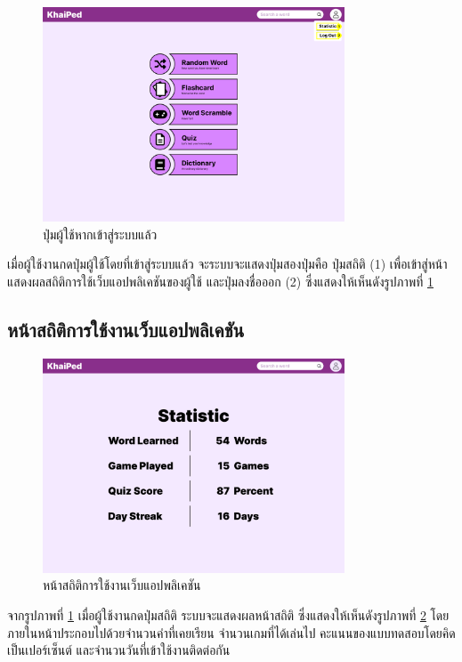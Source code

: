 \documentclass[12pt,oneside,openright,a4paper]{cpe-thai-project}
\begin{document}
\pagebreak
\begin{figure}[!h]\centering
	\includegraphics[width=0.8\textwidth, keepaspectratio=true]{image/chap3/ui/statistic/Home page - Logged In User Button.png}
	\caption{ปุ่มผู้ใช้หากเข้าสู่ระบบแล้ว}\label{fig:UI_UserButton}
\end{figure}
\hspace{1cm}
เมื่อผู้ใช้งานกดปุ่มผู้ใช้โดยที่เข้าสู่ระบบแล้ว จะระบบจะแสดงปุ่มสองปุ่มคือ ปุ่มสถิติ (1) เพื่อเข้าสู่หน้าแสดงผลสถิติการใช้เว็บแอปพลิเคชันของผู้ใช้ และปุ่มลงชื่อออก (2)
ซึ่งแสดงให้เห็นดังรูปภาพที่ \ref{fig:UI_UserButton}

\subsection{หน้าสถิติการใช้งานเว็บแอปพลิเคชัน}
\begin{figure}[!h]\centering
	\includegraphics[width=0.8\textwidth, keepaspectratio=true]{image/chap3/ui/statistic/Statistic.png}
	\caption{หน้าสถิติการใช้งานเว็บแอปพลิเคชัน}\label{fig:UI_Statistic}
\end{figure}
\hspace{1cm}
จากรูปภาพที่ \ref{fig:UI_UserButton} เมื่อผู้ใช้งานกดปุ่มสถิติ ระบบจะแสดงผลหน้าสถิติ ซึ่งแสดงให้เห็นดังรูปภาพที่ \ref{fig:UI_Statistic} 
โดยภายในหน้าประกอบไปด้วยจำนวนคำที่เคยเรียน จำนวนเกมที่ได้เล่นไป คะแนนของแบบทดสอบโดยคิดเป็นเปอร์เซ็นต์ และจำนวนวันที่เข้าใช้งานติดต่อกัน
\end{document}
